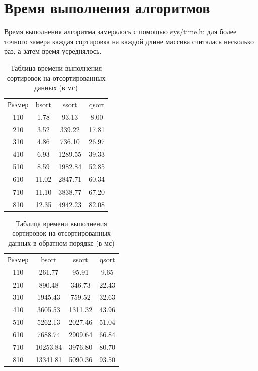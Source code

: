 \documentclass{report}
\begin{document}
\section{Время выполнения алгоритмов}
Время выполнения алгоритма замерялось с помощью sys/time.h: для более точного замера каждая сортировка на каждой длине массива считалась несколько раз, а затем время усреднялось. 

\begin{table} [h!]
	\caption{Таблица времени выполнения сортировок на отсортированных данных (в мс)}
	\begin{center}
	\begin{tabular}{|c c c c|}

		\hline

		Размер & bsort & ssort & qsort  \\ [0.5ex]

110 & 1.78 & 93.13 & 8.00  \\ 
\hline
210 & 3.52 & 339.22 & 17.81  \\ 
\hline
310 & 4.86 & 736.10 & 26.97  \\ 
\hline
410 & 6.93 & 1289.55 & 39.33  \\ 
\hline
510 & 8.59 & 1982.84 & 52.85  \\ 
\hline
610 & 11.02 & 2847.71 & 60.34  \\ 
\hline
710 & 11.10 & 3838.77 & 67.20  \\ 
\hline
810 & 12.35 & 4942.23 & 82.08  \\ 

	\hline 
	\end{tabular}
	\end{center}
\end{table}

\begin{table} [h!]
	\caption{Таблица времени выполнения сортировок на отсортированных данных в обратном порядке (в мс)}
	\begin{center}
	\begin{tabular}{|c c c c|}

		\hline

		Размер & bsort & ssort & qsort \\ [0.5ex]

110 & 261.77 & 95.91 & 9.65  \\ 
\hline
210 & 890.48 & 346.73 & 22.43  \\ 
\hline
310 & 1945.43 & 759.52 & 32.63  \\ 
\hline
410 & 3605.53 & 1311.32 & 43.96  \\ 
\hline
510 & 5262.13 & 2027.46 & 51.04  \\ 
\hline
610 & 7688.74 & 2909.64 & 66.84  \\ 
\hline
710 & 10253.84 & 3976.80 & 80.70  \\ 
\hline
810 & 13341.81 & 5090.36 & 93.50  \\ 
\hline

	\end{tabular}
	\end{center}
\end{table}
\end{document}
